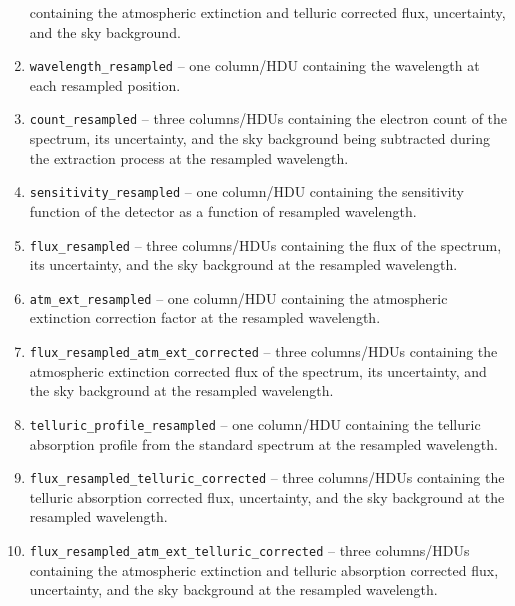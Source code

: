 \documentclass[linenumbers, twocolumn]{aastex631}
\begin{document}
\begin{enumerate}
    containing the atmospheric extinction and telluric corrected flux,
    uncertainty, and the sky background.
    \item \texttt{wavelength\_resampled} -- one column/HDU containing the
    wavelength at each resampled position.
    \item \texttt{count\_resampled} -- three columns/HDUs containing the
    electron count of the spectrum, its uncertainty, and the sky background
    being subtracted during the extraction process at the resampled wavelength.
    \item \texttt{sensitivity\_resampled} -- one column/HDU containing the
    sensitivity function of the detector as a function of resampled wavelength.
    \item \texttt{flux\_resampled} -- three columns/HDUs containing the
    flux of the spectrum, its uncertainty, and the sky background at the
    resampled wavelength.
    \item \texttt{atm\_ext\_resampled} -- one column/HDU containing the
    atmospheric extinction correction factor at the resampled wavelength.
    \item \texttt{flux\_resampled\_atm\_ext\_corrected} -- three columns/HDUs
    containing the atmospheric extinction corrected flux of the spectrum, its
    uncertainty, and the sky background at the resampled wavelength.
    \item \texttt{telluric\_profile\_resampled} -- one column/HDU containing
    the telluric absorption profile from the standard spectrum at the resampled
    wavelength.
    \item \texttt{flux\_resampled\_telluric\_corrected} -- three columns/HDUs
    containing the telluric absorption corrected flux, uncertainty, and the sky
    background at the resampled wavelength.
    \item \texttt{flux\_resampled\_atm\_ext\_telluric\_corrected} -- three
    columns/HDUs containing the atmospheric extinction and telluric absorption
    corrected flux, uncertainty, and the sky background at the resampled
    wavelength.
\end{enumerate}


\end{document}

